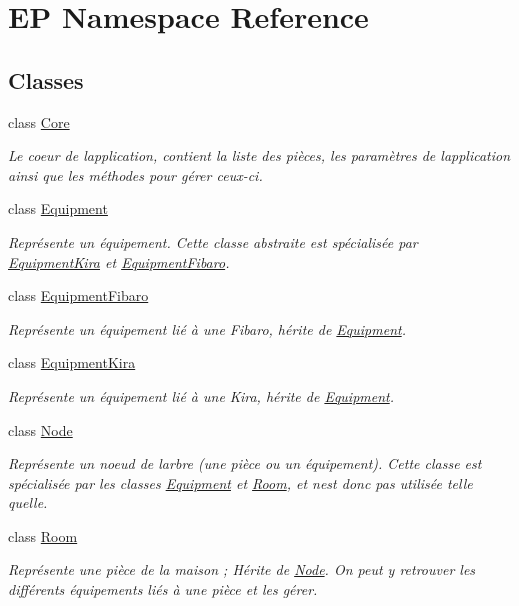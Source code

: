 \hypertarget{namespace_e_p}{}\section{EP Namespace Reference}
\label{namespace_e_p}
\subsection*{Classes}
\begin{DoxyCompactItemize}
\item 
class \hyperlink{class_e_p_1_1_core}{Core}
\begin{DoxyCompactList}\small\item\em Le coeur de l\textquotesingle{}application, contient la liste des pièces, les paramètres de l\textquotesingle{}application ainsi que les méthodes pour gérer ceux-\/ci. \end{DoxyCompactList}\item 
class \hyperlink{class_e_p_1_1_equipment}{Equipment}
\begin{DoxyCompactList}\small\item\em Représente un équipement. Cette classe abstraite est spécialisée par \hyperlink{class_e_p_1_1_equipment_kira}{Equipment\+Kira} et \hyperlink{class_e_p_1_1_equipment_fibaro}{Equipment\+Fibaro}. \end{DoxyCompactList}\item 
class \hyperlink{class_e_p_1_1_equipment_fibaro}{Equipment\+Fibaro}
\begin{DoxyCompactList}\small\item\em Représente un équipement lié à une Fibaro, hérite de \hyperlink{class_e_p_1_1_equipment}{Equipment}. \end{DoxyCompactList}\item 
class \hyperlink{class_e_p_1_1_equipment_kira}{Equipment\+Kira}
\begin{DoxyCompactList}\small\item\em Représente un équipement lié à une Kira, hérite de \hyperlink{class_e_p_1_1_equipment}{Equipment}. \end{DoxyCompactList}\item 
class \hyperlink{class_e_p_1_1_node}{Node}
\begin{DoxyCompactList}\small\item\em Représente un noeud de l\textquotesingle{}arbre (une pièce ou un équipement). Cette classe est spécialisée par les classes \hyperlink{class_e_p_1_1_equipment}{Equipment} et \hyperlink{class_e_p_1_1_room}{Room}, et n\textquotesingle{}est donc pas utilisée telle qu\textquotesingle{}elle. \end{DoxyCompactList}\item 
class \hyperlink{class_e_p_1_1_room}{Room}
\begin{DoxyCompactList}\small\item\em Représente une pièce de la maison ; Hérite de \hyperlink{class_e_p_1_1_node}{Node}. On peut y retrouver les différents équipements liés à une pièce et les gérer. \end{DoxyCompactList}\end{DoxyCompactItemize}
